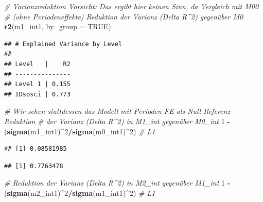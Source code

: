 \documentclass[
]{book}
\newenvironment{Shaded}{\begin{snugshade}}{\end{snugshade}}
\newcommand{\CommentTok}[1]{\textcolor[rgb]{0.56,0.35,0.01}{\textit{#1}}}
\newcommand{\DataTypeTok}[1]{\textcolor[rgb]{0.13,0.29,0.53}{#1}}
\newcommand{\DecValTok}[1]{\textcolor[rgb]{0.00,0.00,0.81}{#1}}
\newcommand{\KeywordTok}[1]{\textcolor[rgb]{0.13,0.29,0.53}{\textbf{#1}}}
\newcommand{\NormalTok}[1]{#1}
\newcommand{\OperatorTok}[1]{\textcolor[rgb]{0.81,0.36,0.00}{\textbf{#1}}}
\newcommand{\OtherTok}[1]{\textcolor[rgb]{0.56,0.35,0.01}{#1}}
\newcommand{\StringTok}[1]{\textcolor[rgb]{0.31,0.60,0.02}{#1}}
\begin{document}
\begin{Shaded}
\begin{Highlighting}[]
\CommentTok{# Varianzreduktion Vorsicht: Das ergibt hier keinen Sinn, da Vergleich mit M00}
\CommentTok{# (ohne Periodeneffekte) Reduktion der Varianz (Delta R^2) gegenüber M0}
\KeywordTok{r2}\NormalTok{(m1_int1, }\DataTypeTok{by_group =} \OtherTok{TRUE}\NormalTok{)}
\end{Highlighting}
\end{Shaded}

\begin{verbatim}
## # Explained Variance by Level
## 
## Level   |    R2
## ---------------
## Level 1 | 0.155
## IDsosci | 0.773
\end{verbatim}

\begin{Shaded}
\begin{Highlighting}[]
\CommentTok{# Wir sehen stattdessen das Modell mit Perioden-FE als Null-Referenz Reduktion}
\CommentTok{# der Varianz (Delta R^2) in M1_int gegenüber M0_int}
\DecValTok{1} \OperatorTok{-}\StringTok{ }\NormalTok{(}\KeywordTok{sigma}\NormalTok{(m1_int1)}\OperatorTok{^}\DecValTok{2}\OperatorTok{/}\KeywordTok{sigma}\NormalTok{(m0_int1)}\OperatorTok{^}\DecValTok{2}\NormalTok{)  }\CommentTok{# L1}
\end{Highlighting}
\end{Shaded}

\begin{verbatim}
## [1] 0.08581985
\end{verbatim}

\begin{Shaded}
\end{Shaded}

\begin{verbatim}
## [1] 0.7763478
\end{verbatim}

\begin{Shaded}
\begin{Highlighting}[]
\CommentTok{# Reduktion der Varianz (Delta R^2) in M2_int gegenüber M1_int}
\DecValTok{1} \OperatorTok{-}\StringTok{ }\NormalTok{(}\KeywordTok{sigma}\NormalTok{(m2_int1)}\OperatorTok{^}\DecValTok{2}\OperatorTok{/}\KeywordTok{sigma}\NormalTok{(m1_int1)}\OperatorTok{^}\DecValTok{2}\NormalTok{)  }\CommentTok{# L1}
\end{Highlighting}
\end{Shaded}
\end{document}
